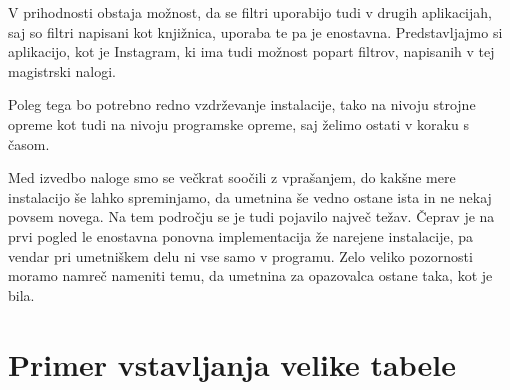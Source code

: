 \documentclass[a4paper, 12pt]{book}
\begin{document}
V prihodnosti obstaja možnost, da se filtri uporabijo tudi v drugih
aplikacijah, saj so filtri napisani kot knjižnica, uporaba te pa je
enostavna. Predstavljajmo si aplikacijo, kot je Instagram, ki ima tudi
možnost popart filtrov, napisanih v tej magistrski nalogi.

Poleg tega bo potrebno redno vzdrževanje instalacije, tako na
nivoju strojne opreme kot tudi na nivoju programske opreme, saj želimo ostati
v koraku s časom.

Med izvedbo naloge smo se večkrat soočili z vprašanjem, do kakšne mere
instalacijo še lahko spreminjamo, da umetnina še vedno ostane ista in ne nekaj
povsem novega. Na tem področju se je tudi pojavilo največ težav. Čeprav je na
prvi pogled le enostavna ponovna implementacija že narejene instalacije, pa
vendar pri umetniškem delu ni vse samo v programu. Zelo veliko pozornosti
moramo namreč nameniti temu, da umetnina za opazovalca ostane taka, kot je
bila.










\appendix
\chapter{Primer vstavljanja velike tabele}
\label{ch:dodatek}

\begin{landscape}

\begin{table}[ht]
\caption{Primer vključevanja večje tabele v \LaTeX{}.}
\centering
{}
\label{tab:tab1}
\end{table}
\end{landscape}


\backmatter
\end{document}
